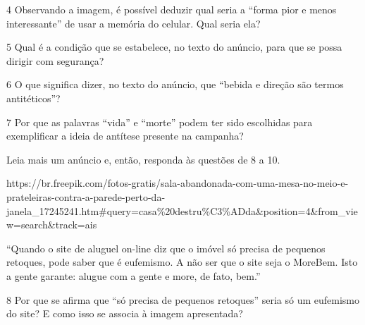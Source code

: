 \begin{itemize}
\begin{itemize}
\num{4} Observando a imagem, é possível deduzir qual seria a ``forma
pior e menos interessante'' de usar a memória do celular. Qual seria
ela? 

\num{5} Qual é a condição que se estabelece, no texto do anúncio, para
que se possa dirigir com segurança? 

\num{6} O que significa dizer, no texto do anúncio, que ``bebida e
direção são termos antitéticos''? 


\num{7} Por que as palavras ``vida'' e ``morte'' podem ter sido
escolhidas para exemplificar a ideia de antítese presente na campanha?

Leia mais um anúncio e, então, responda às questões de 8 a 10.

https://br.freepik.com/fotos-gratis/sala-abandonada-com-uma-mesa-no-meio-e-prateleiras-contra-a-parede-perto-da-janela\_17245241.htm\#query=casa\%20destru\%C3\%ADda\&position=4\&from\_view=search\&track=ais

``Quando o site de aluguel on-line diz que o imóvel só precisa de
pequenos retoques, pode saber que é eufemismo. A não ser que o site seja
o MoreBem. Isto a gente garante: alugue com a gente e more, de fato,
bem.''

\num{8} Por que se afirma que ``só precisa de pequenos retoques'' seria
só um eufemismo do site? E como isso se associa à imagem apresentada?


\end{itemize}
\end{itemize}
